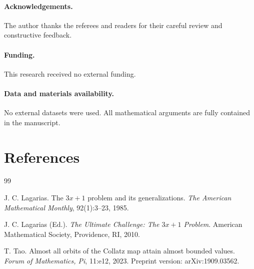 \documentclass[preprint,12pt]{elsarticle}
\begin{document}
\paragraph{Acknowledgements.}
The author thanks the referees and readers for their careful review and constructive feedback.

\paragraph{Funding.}
This research received no external funding.

\paragraph{Data and materials availability.}
No external datasets were used. All mathematical arguments are fully contained in the manuscript.

\section*{References}
\begin{thebibliography}{99}

J. C. Lagarias.
\newblock The $3x + 1$ problem and its generalizations.
\newblock \emph{The American Mathematical Monthly}, 92(1):3--23, 1985.

J. C. Lagarias (Ed.).
\newblock \emph{The Ultimate Challenge: The $3x+1$ Problem}.
\newblock American Mathematical Society, Providence, RI, 2010.

T. Tao.
\newblock Almost all orbits of the Collatz map attain almost bounded values.
\newblock \emph{Forum of Mathematics, Pi}, 11:e12, 2023.
\newblock Preprint version: arXiv:1909.03562.

\end{thebibliography}
\end{document}
